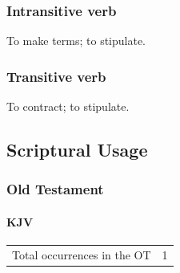 	\subsubsection{Intransitive verb}
	
		\begin{compactitem}
			\item To make terms; to stipulate.
		\end{compactitem}
		
	\subsubsection{Transitive verb}
	
		\begin{compactitem}
			\item To contract; to stipulate.
		\end{compactitem}



\subsection{Scriptural Usage} %
	\label{CONDITION-SCRIPTURES}

	\subsubsection{Old Testament} %
		\label{CONDITION-OT}
	
		\paragraph{KJV}
			\label{CONDITION-OT-KJV}
	
			\begin{tabular}{ll}
				Total occurrences in the OT & 1
			\end{tabular}
			
